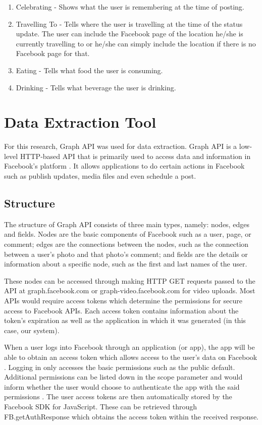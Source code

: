 \begin{enumerate} [label=\alph*.]
\item Celebrating - Shows what the user is remembering at the time of posting.
\item Travelling To - Tells where the user is travelling at the time of the status update. The user can include the Facebook page of the location he/she is currently travelling to or he/she can simply include the location if there is no Facebook page for that.
\item Eating - Tells what food the user is consuming.
\item Drinking - Tells what beverage the user is drinking.
\end{enumerate}

\section{Data Extraction Tool}
For this research, Graph API was used for data extraction. Graph API is a low-level HTTP-based API that is primarily used to access data and information in Facebook's platform \cite{FacebookGraphAndroid2016}. It allows applications to do certain actions in Facebook such as publish updates, media files and even schedule a post. 

\subsection{Structure}
The structure of Graph API consists of three main types, namely: nodes, edges and fields. Nodes are the basic components of Facebook such as a user, page, or comment; edges are the connections between the nodes, such as the connection between a user's photo and that photo's comment; and fields are the details or information about a specific node, such as the first and last names of the user.

These nodes can be accessed through making HTTP GET requests passed to the API at graph.facebook.com or graph-video.facebook.com for video uploads. Most APIs would require access tokens which determine the permissions for secure access to Facebook APIs. Each access token contains information about the token's expiration as well as the application in which it was generated (in this case, our system).

When a user logs into Facebook through an application (or app), the app will be able to obtain an access token which allows access to the user's data on Facebook \cite{FacebookToken2013}. Logging in only accesses the basic permissions such as the public default. Additional permissions can be listed down in the scope parameter and would inform whether the user would choose to authenticate the app with the said permissions \cite{FacebookJavaScript}. The user access tokens are then automatically stored by the Facebook SDK for JavaScript. These can be retrieved through FB.getAuthResponse which obtains the access token within the received response.

